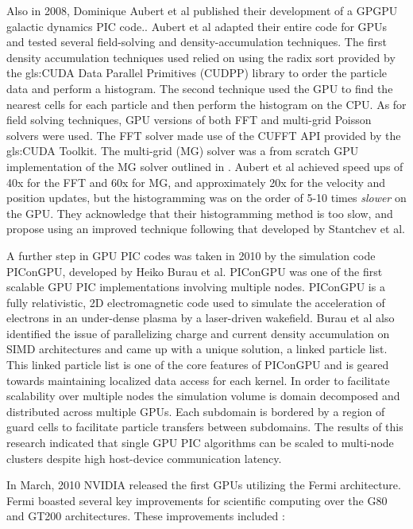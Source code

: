 Also in 2008, Dominique Aubert et al published their development of a GPGPU galactic dynamics PIC code.\cite{Aubert2009}. Aubert et al adapted their entire code for GPUs and tested several field-solving and density-accumulation techniques. The first density accumulation techniques used relied on using the radix sort provided by the \gls{gls:CUDA} Data Parallel Primitives (CUDPP) library to order the particle data and perform a histogram. The second technique used the GPU to find the nearest cells for each particle and then perform the histogram on the CPU. As for field solving techniques, GPU versions of both FFT and multi-grid Poisson solvers were used. The FFT solver made use of the CUFFT API provided by the \gls{gls:CUDA} Toolkit. The multi-grid (MG) solver was a from scratch GPU implementation of the MG solver outlined in \cite{NumericalRecipes}. Aubert et al achieved speed ups of 40x for the FFT and 60x for MG, and approximately 20x for the velocity and position updates, but the histogramming was on the order of 5-10 times \emph{slower} on the GPU. They acknowledge that their histogramming method is too slow, and propose using an improved technique following that developed by Stantchev et al.

A further step in GPU PIC codes was taken in 2010 by the simulation code PIConGPU\cite{Burau2010}, developed by Heiko Burau et al. PIConGPU was one of the first scalable GPU PIC implementations involving multiple nodes. PIConGPU is a fully relativistic, 2D electromagnetic code used to simulate the acceleration of electrons in an under-dense plasma by a laser-driven wakefield. Burau et al also identified the issue of parallelizing charge and current density accumulation on SIMD architectures and came up with a unique solution, a linked particle list. This linked particle list is one of the core features of PIConGPU and is geared towards maintaining localized data access for each kernel. In order to facilitate scalability over multiple nodes the simulation volume is domain decomposed and distributed across multiple GPUs. Each subdomain is bordered by a region of guard cells to facilitate particle transfers between subdomains. The results of this research indicated that single GPU PIC algorithms can be scaled to multi-node clusters despite high host-device communication latency.

In March, 2010 NVIDIA released the first GPUs utilizing the Fermi architecture. Fermi boasted several key improvements for scientific computing over the G80 and GT200 architectures. These improvements included \cite{NVIDIACorporation2009}:


